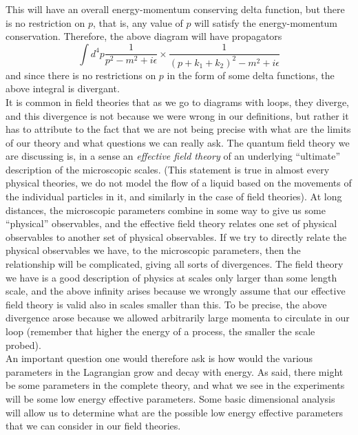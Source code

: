 \documentclass[11pt]{article}
\numberwithin{equation}{section}
\begin{document}
This will have an overall energy-momentum conserving delta function, but there is no restriction on \(p\), that is, any value of \(p\) will satisfy the energy-momentum conservation. Therefore, the above diagram will have propagators
\begin{equation*}
    \int d^4p \frac{1}{p^2 - m^2 + i\epsilon}\times \frac{1}{(p+k_1+k_2)^2 - m^2 + i\epsilon}
\end{equation*}
and since there is no restrictions on \(p\) in the form of some delta functions, the above integral is divergant.\\

It is common in field theories that as we go to diagrams with loops, they diverge, and this divergence is not because we were wrong in our definitions, but rather it has to attribute to the fact that we are not being precise with what are the limits of our theory and what questions we can really ask. The quantum field theory we are discussing is, in a sense an \textit{effective field theory} of an underlying ``ultimate'' description of the microscopic scales. (This statement is true in almost every physical theories, we do not model the flow of a liquid based on the movements of the individual particles in it, and similarly in the case of field theories). At long distances, the microscopic parameters combine in some way to give us some ``physical'' observables, and the effective field theory relates one set of physical observables to another set of physical observables. If we try to directly relate the physical observables we have, to the microscopic parameters, then the relationship will be complicated, giving all sorts of divergences. The field theory we have is a good description of physics at scales only larger than some length scale, and the above infinity arises because we wrongly assume that our effective field theory is valid also in scales smaller than this. To be precise, the above divergence arose because we allowed arbitrarily large momenta to circulate in our loop (remember that higher the energy of a process, the smaller the scale probed).\\

An important question one would therefore ask is how would the various parameters in the Lagrangian grow and decay with energy. As said, there might be some parameters in the complete theory, and what we see in the experiments will be some low energy effective parameters. Some basic dimensional analysis will allow us to determine what are the possible low energy effective parameters that we can consider in our field theories.
\end{document}
